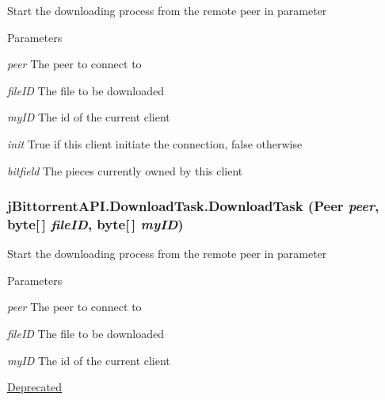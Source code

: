\label{classj_bittorrent_a_p_i_1_1_download_task_a32181ebfc1d30259b58847cd6ffb527b}
Start the downloading process from the remote peer in parameter 
\begin{DoxyParams}{Parameters}
\item[{\em peer}]The peer to connect to \item[{\em fileID}]The file to be downloaded \item[{\em myID}]The id of the current client \item[{\em init}]True if this client initiate the connection, false otherwise \item[{\em bitfield}]The pieces currently owned by this client \end{DoxyParams}
\hypertarget{classj_bittorrent_a_p_i_1_1_download_task_aa6305d83b8254e0768b5f4cb04d6c7c9}{
\subsubsection[{DownloadTask}]{\setlength{\rightskip}{0pt plus 5cm}jBittorrentAPI.DownloadTask.DownloadTask ({\bf Peer} {\em peer}, \/  byte\mbox{[}$\,$\mbox{]} {\em fileID}, \/  byte\mbox{[}$\,$\mbox{]} {\em myID})}}
\label{classj_bittorrent_a_p_i_1_1_download_task_aa6305d83b8254e0768b5f4cb04d6c7c9}
Start the downloading process from the remote peer in parameter 
\begin{DoxyParams}{Parameters}
\item[{\em peer}]The peer to connect to \item[{\em fileID}]The file to be downloaded \item[{\em myID}]The id of the current client \end{DoxyParams}
\begin{Desc}
\item[\hyperlink{deprecated__deprecated000002}{Deprecated}]\end{Desc}


